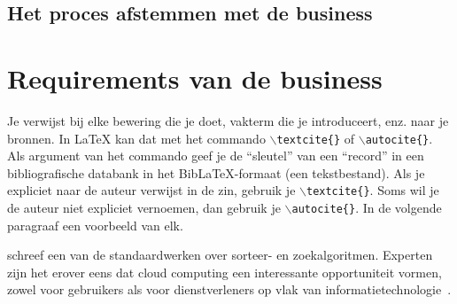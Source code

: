 \subsection{Het proces afstemmen met de business}

\section{Requirements van de business}
Je verwijst bij elke bewering die je doet, vakterm die je introduceert, enz. naar je bronnen. In \LaTeX{} kan dat met het commando \texttt{$\backslash${textcite\{\}}} of \texttt{$\backslash${autocite\{\}}}. Als argument van het commando geef je de ``sleutel'' van een ``record'' in een bibliografische databank in het Bib\LaTeX{}-formaat (een tekstbestand). Als je expliciet naar de auteur verwijst in de zin, gebruik je \texttt{$\backslash${}textcite\{\}}.
Soms wil je de auteur niet expliciet vernoemen, dan gebruik je \texttt{$\backslash${}autocite\{\}}. In de volgende paragraaf een voorbeeld van elk.

\textcite{Knuth1998} schreef een van de standaardwerken over sorteer- en zoekalgoritmen. Experten zijn het erover eens dat cloud computing een interessante opportuniteit vormen, zowel voor gebruikers als voor dienstverleners op vlak van informatietechnologie~\autocite{Creeger2009}.

\lipsum[7-20]
